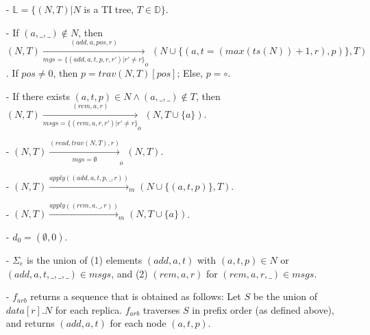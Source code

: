 \begin{itemize}
\setlength{\itemsep}{0.5pt}
\item[-] $\mathbb{L} = \{ (N,T) \vert N$ is a TI tree, $T \in \mathbb{D} \}$.

\item[-] If $(a,\_,\_) \notin N$, then $(N,T) \xrightarrow[\mathit{mgs} = \{ (\mathit{add},a,t,p,r,r') \vert r' \neq r \}]{(\mathit{add},a,\mathit{pos},r)}_o (N \cup \{ (a,t=(\mathit{max}(\mathit{ts}(N))+1,r),p) \}, T)$. If $\mathit{pos} \neq 0$, then $p = \mathit{trav}(N,T)[\mathit{pos}]$; Else, $p = \circ$.

\item[-] If there exists $(a,t,p) \in N \wedge (a,\_,\_) \notin T$, then $(N,T) \xrightarrow[\mathit{msgs} = \{ (\mathit{rem},a,r,r') \vert r' \neq r \} ]{(\mathit{rem},a,r)}_o (N,T \cup \{ a \})$.

\item[-] $(N,T) \xrightarrow[\mathit{mgs} = \emptyset]{(\mathit{read},\mathit{trav}(N,T),r)}_o (N,T)$.

\item[-] $(N,T) \xrightarrow{\mathit{apply}((\mathit{add},a,t,p,\_,r))}_m (N \cup \{ (a,t,p) \},T)$.

\item[-] $(N,T) \xrightarrow{\mathit{apply}((\mathit{rem},a,\_,r))}_m (N,T \cup \{ a \})$.

\item[-] $d_0 = (\emptyset,0)$.

\item[-] $\Sigma_e$ is the union of (1) elements $(\mathit{add},a,t)$ with $(a,t,p)\in N$ or $(\mathit{add},a,t,\_,\_,\_) \in \mathit{msgs}$, and (2) $(\mathit{rem},a,r)$ for $(\mathit{rem},a,r,\_) \in \mathit{msgs}$.
\item[-] $f_{\mathit{arb}}$ returns a sequence that is obtained as follows: Let $S$ be the union of $\mathit{data}[r].N$ for each replica. $f_{\mathit{arb}}$ traverses $S$ in prefix order (as defined above), and returns $(\mathit{add},a,t)$ for each node $(a,t,p)$.
\end{itemize}






























